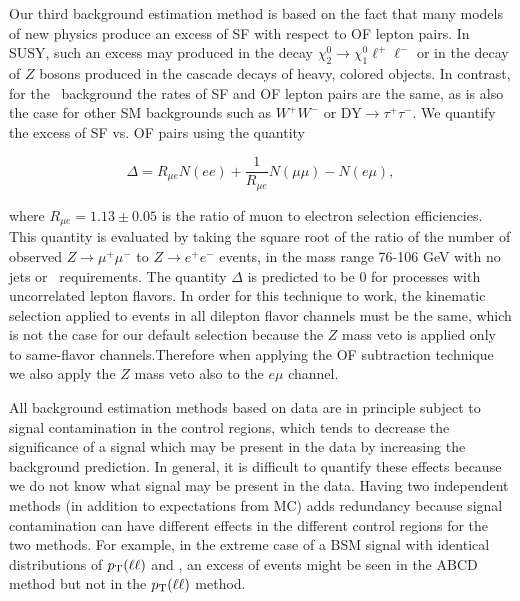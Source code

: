 Our third background estimation method is based on the fact that many models of new physics
produce an excess of SF with respect to OF lepton pairs. In SUSY, such an excess may produced
in the decay $\chi_2^0 \to \chi_1^0 \ell^+\ell^-$ or in the decay of $Z$ bosons produced in
the cascade decays of heavy, colored objects. In contrast, for the \ttbar\ background the
rates of SF and OF lepton pairs are the same, as is also the case for other SM backgrounds
such as $W^+W^-$ or DY$\to\tau^+\tau^-$. We quantify the excess of SF vs. OF pairs using the
quantity

\begin{equation}
\label{eq:ofhighpt}
\Delta = R_{\mu e}N(ee) + \frac{1}{R_{\mu e}}N(\mu\mu) - N(e\mu),
\end{equation}

where $R_{\mu e} = 1.13 \pm 0.05$ is the ratio of muon to electron selection efficiencies.
This quantity is evaluated by taking the square root of the ratio of the number of observed
$Z \to \mu^+\mu^-$ to $Z \to e^+e^-$ events, in the mass range 76-106 GeV with no jets or 
\met\ requirements. The quantity $\Delta$ is predicted to be 0 for processes with 
uncorrelated lepton flavors. In order for this technique to work, the kinematic selection 
applied to events in all dilepton flavor channels must be the same, which is not the case 
for our default selection because the $Z$ mass veto is applied only to same-flavor channels.Therefore when applying the OF subtraction technique we also apply the $Z$ mass veto also 
to the $e\mu$ channel. 

All background estimation methods based on data are in principle subject to signal contamination
in the control regions, which tends to decrease the significance of a signal
which may be present in the data by increasing the background prediction.
In general, it is difficult to quantify these effects because we 
do not know what signal may be present in the data.  Having two
independent methods (in addition to expectations from MC)
adds redundancy because signal contamination can have different effects
in the different control regions for the two methods.
For example, in the extreme case of a
BSM signal with identical distributions of $p_{\mathrm{T}}(\ell \ell)$ and \MET, an excess of events might be seen 
in the ABCD method but not in the $p_{\mathrm{T}}(\ell \ell)$ method.

